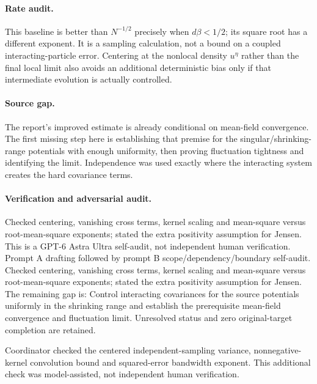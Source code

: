 \documentclass[11pt]{article}
\begin{document}
\paragraph{Rate audit.} This baseline is better than \(N^{-1/2}\) precisely when \(d\beta<1/2\); its square root has a different exponent. It is a sampling calculation, not a bound on a coupled interacting-particle error. Centering at the nonlocal density \(u^\eta\) rather than the final local limit also avoids an additional deterministic bias only if that intermediate evolution is actually controlled.
\paragraph{Source gap.} The report's improved estimate is already conditional on mean-field convergence. The first missing step here is establishing that premise for the singular/shrinking-range potentials with enough uniformity, then proving fluctuation tightness and identifying the limit. Independence was used exactly where the interacting system creates the hard covariance terms.

\paragraph{Verification and adversarial audit.}
Checked centering, vanishing cross terms, kernel scaling and mean-square versus root-mean-square exponents; stated the extra positivity assumption for Jensen. This is a GPT-6 Astra Ultra self-audit, not independent human verification. Prompt A drafting followed by prompt B scope/dependency/boundary self-audit. Checked centering, vanishing cross terms, kernel scaling and mean-square versus root-mean-square exponents; stated the extra positivity assumption for Jensen. The remaining gap is: Control interacting covariances for the source potentials uniformly in the shrinking range and establish the prerequisite mean-field convergence and fluctuation limit. Unresolved status and zero original-target completion are retained.

Coordinator checked the centered independent-sampling variance, nonnegative-kernel convolution bound and squared-error bandwidth exponent. This additional check was model-assisted, not independent human verification.
\end{document}
